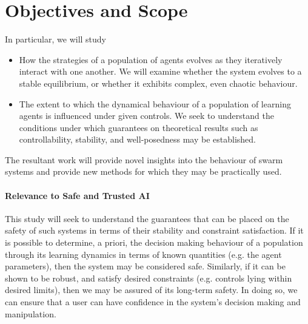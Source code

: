 \documentclass[.../main.tex]{subfiles}
\begin{document}
    \section{Objectives and Scope} \label{sec::Objectives_and_Scope}

    In particular, we will study

    \begin{itemize}
    	\item How the strategies of a population of agents evolves as they iteratively interact
    	with one another. We will examine whether the system evolves to a stable equilibrium, or
    	whether it exhibits complex, even chaotic behaviour.
    	\item The extent to which the dynamical behaviour of a population of learning agents is
    	influenced under given controls. We seek to understand the conditions under which guarantees
    	on theoretical results such as controllability, stability, and well-posedness may be
    	established.
    \end{itemize}

    The resultant work will provide novel insights into the behaviour of swarm systems and provide
    new methods for which they may be practically used. 

\paragraph{Relevance to Safe and Trusted AI} This study will seek to understand the guarantees that can be
    placed on the safety of such systems in terms of their stability
    and constraint satisfaction. If it is possible to determine, a
    priori, the decision making behaviour of a population through its
    learning dynamics in terms of known quantities (e.g. the agent
    parameters), then the system may be considered safe. Similarly, if
    it can be shown to be robust, and satisfy desired constraints
    (e.g. controls lying within desired limits), then we may be
    assured of its long-term safety. In doing so, we can ensure that a
    user can have confidence in the system's decision making and
    manipulation.
\end{document}
